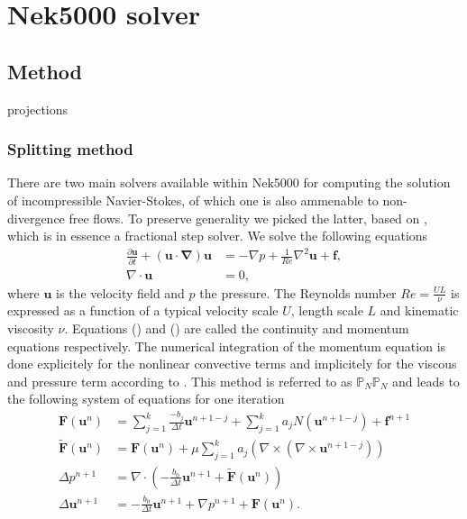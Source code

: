 \documentclass{sig-alternate}
\begin{document}



\section{Nek5000 solver}

\subsection{Method}
projections

\subsubsection{Splitting method}
There are two main solvers available within Nek5000 for computing the solution of incompressible Navier-Stokes, of which one is also ammenable to non-divergence free flows. To preserve generality we picked the latter, based on \cite{Tomboulides1997}, which is in essence a fractional step solver. We solve the following equations
\begin{align}
 \frac{\partial \mathbf{u}}{\partial t} + (\mathbf{u \cdot \nabla}) \mathbf{u} & = - \nabla p + \frac{1}{Re} \nabla^2 \mathbf{u} + \mathbf{f} \label{eqn:NS_momentum},\\
 \nabla \cdot \mathbf{u} & = 0, \label{eqn:NS_continuity}
\end{align}
where $\mathbf{u}$ is the velocity field and $p$ the pressure. The Reynolds number $Re = \frac{U L}{\nu}$ is expressed as a function of a typical velocity scale $U$, length scale $L$ and kinematic viscosity $\nu$. Equations ()  and () are called the continuity and momentum equations respectively. The numerical integration of the momentum equation is done explicitely for the nonlinear convective terms and implicitely for the viscous and pressure term according to \cite{Tomboulides1997}. This method is referred to as $\mathbb{P}_N\mathbb{P}_N$ and leads to the following system of equations for one iteration
\begin {align}
 \mathbf{F} \left( \mathbf{u}^{n} \right) & = \sum_{j=1}^{k} \frac{-b_j}{\Delta t} \mathbf{u}^{n+1-j} + \sum_{j=1}^{k} a_j N \left( \mathbf{u}^{n+1-j} \right) +  \mathbf{f}^{n+1} \label{eqn:rhs1}\\
 \mathbf{\tilde{F}} \left( \mathbf{u}^{n} \right) & = \mathbf{F}\left(\mathbf{u}^{n}\right) + \mu \sum_{j=1}^{k} a_j \left( \nabla \times \left( \nabla \times \mathbf{u}^{n+1-j} \right) \right) \label{eqn:rhs2} \\
 \Delta p^{n+1} & = \nabla \cdot \left( -\frac{b_0}{\Delta t} \mathbf{u}^{n+1} + \mathbf{\tilde{F}} \left( \mathbf{u}^{n} \right) \right) \label{eqn:hmhz_pres}\\
 \Delta \mathbf{u}^{n+1} & = - \frac{b_0}{\Delta t} \mathbf{u}^{n+1} + \nabla p^{n+1} + \mathbf{F} \left( \mathbf{u}^{n} \right). \label{eqn:hmhz_vel}
\end {align}
\end{document}
